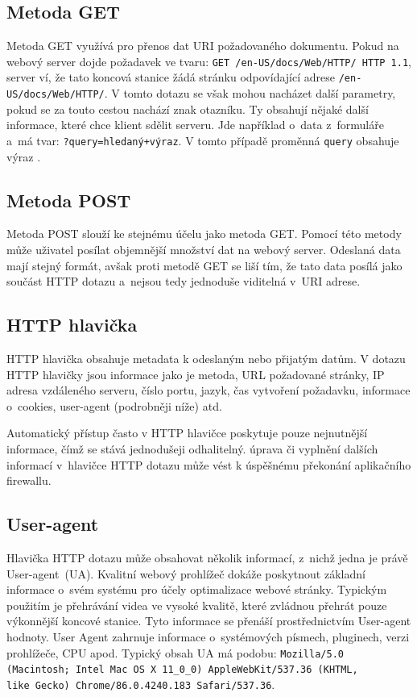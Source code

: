 \subsection*{Metoda GET}
Metoda GET využívá pro přenos dat URI požadovaného dokumentu. Pokud na webový server dojde požadavek ve tvaru: \texttt{GET /en-US/docs/Web/HTTP/ HTTP 1.1}, server ví, že tato koncová stanice žádá stránku odpovídající adrese \texttt{/en-US/docs/Web/HTTP/}. V tomto dotazu se však mohou nacházet další parametry, pokud se za touto cestou nachází znak otazníku. Ty obsahují nějaké další informace, které chce klient sdělit serveru. Jde například o~data z~formuláře a~má tvar: \texttt{?query=hledaný+výraz}. V tomto případě proměnná \texttt{query} obsahuje výraz .

\subsection*{Metoda POST}
Metoda POST slouží ke stejnému účelu jako metoda GET. Pomocí této metody může uživatel posílat objemnější množství dat na webový server. Odeslaná data mají stejný formát, avšak proti metodě GET se liší tím, že tato data posílá jako součást HTTP dotazu a~nejsou tedy jednoduše viditelná v~URI adrese. 

\subsection*{HTTP hlavička}
HTTP hlavička obsahuje metadata k odeslaným nebo přijatým datům. V dotazu HTTP hlavičky jsou informace jako je metoda, URL požadované stránky, IP adresa vzdáleného serveru, číslo portu, jazyk, čas vytvoření požadavku, informace o~cookies, user-agent (podrobněji níže) atd.

Automatický přístup často v HTTP hlavičce poskytuje pouze nejnutnější informace, čímž se stává jednodušeji odhalitelný.  úprava či vyplnění dalších informací v~hlavičce HTTP dotazu může vést k úspěšnému překonání aplikačního firewallu.

\subsection*{User-agent}
\label{sec:user_agent}
Hlavička HTTP dotazu může obsahovat několik informací, z~nichž jedna je právě User-agent~(UA). Kvalitní webový prohlížeč dokáže poskytnout základní informace o~svém systému pro účely optimalizace webové stránky. Typickým použitím je přehrávání videa ve vysoké kvalitě, které zvládnou přehrát pouze výkonnější koncové stanice. Tyto informace se přenáší prostřednictvím User-agent hodnoty. User Agent zahrnuje informace o~systémových písmech, pluginech, verzi prohlížeče, CPU apod. Typický obsah UA má podobu: \texttt{Mozilla/5.0 (Macintosh; Intel Mac OS X 11\_0\_0) AppleWebKit/537.36 (KHTML,
\\
like Gecko) Chrome/86.0.4240.183 Safari/537.36}.

